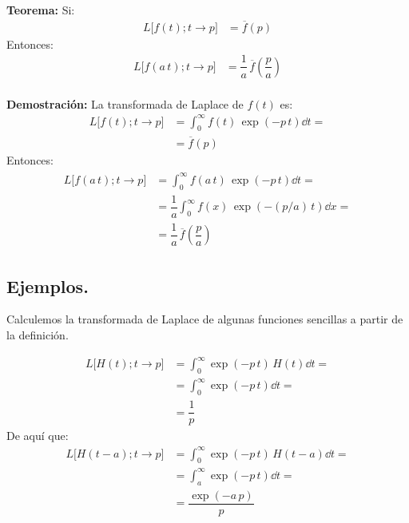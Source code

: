 \noindent \textbf{Teorema: } Si:
\begin{align*}
L \big[f(t); t \to p\big] &= \overline{f} (p)
\end{align*}
Entonces:
\begin{align*}
L \big[f(a \, t); t \to p\big] &= \dfrac{1}{a} \, \overline{f} \left(\dfrac{p}{a}\right)
\end{align*}
\\[0.5em]
\textbf{Demostración: } La transformada de Laplace de $f(t)$ es:
\begin{align*}
L \big[f(t); t \to p\big] &= \int_{0}^{\infty} f(t) \, \exp(-p \, t) \dd{t} = \\[0.5em]
&= \overline{f} (p)
\end{align*}
Entonces:
\begin{align}
\begin{aligned}
L \big[f(a \, t); t \to p\big] &= \int_{0}^{\infty} f(a \, t) \, \exp(-p \, t) \dd{t} = \\[0.5em]
&= \dfrac{1}{a} \int_{0}^{\infty} f(x) \, \exp(- (p/a) \, t) \dd{x} = \\[0.5em]
&= \dfrac{1}{a} \, \overline{f} \left(\dfrac{p}{a}\right)
\end{aligned}
\label{eq:ecuacion_03_09}
\end{align}

\subsection*{Ejemplos.}

Calculemos la transformada de Laplace de algunas funciones sencillas a partir de la definición.

\begin{ejemplo}
\begin{align*}
L \big[H(t); t \to p\big] &= \int_{0}^{\infty} \exp(- p \, t) \, H(t) \dd{t} = \\[0.5em]
&= \int_{0}^{\infty} \exp(- p \, t) \dd{t} = \\[0.5em]
&= \dfrac{1}{p}
\end{align*}
De aquí que:
\begin{align*}
L \big[H(t - a); t \to p\big] &= \int_{0}^{\infty} \exp(- p \, t) \, H(t - a) \dd{t} = \\[0.5em]
&= \int_{a}^{\infty} \exp(- p \, t) \dd{t} = \\[0.5em]
&= \dfrac{\exp(-a \, p)}{p}
\end{align*}
\end{ejemplo}

